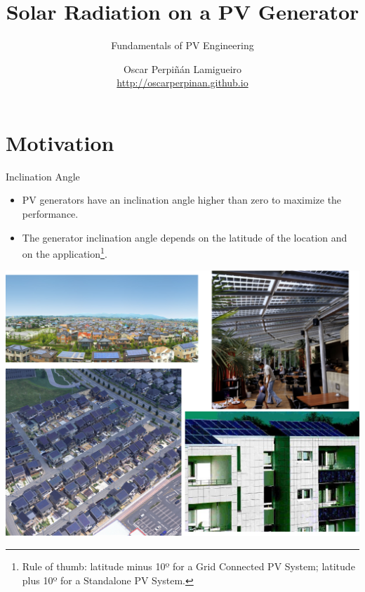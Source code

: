 \documentclass[xcolor={usenames,svgnames,dvipsnames}]{beamer}
\author{Oscar Perpiñán Lamigueiro \\ \url{http://oscarperpinan.github.io}}
\date{}
\title{Solar Radiation on a PV Generator}
\subtitle{Fundamentals of PV Engineering}
\begin{document}
\maketitle

\section{Motivation}
\label{sec:orgf4af781}
\begin{frame}[label={sec:org9c4a0ec}]{Inclination Angle}
\begin{itemize}
\item PV generators have an \alert{inclination angle higher than zero} to maximize the performance.
\item The generator inclination angle depends on the latitude of the location and on the application\footnote{Rule of thumb: latitude minus 10º for a Grid Connected PV System; latitude plus 10º for a Standalone PV System.}.
\end{itemize}

\begin{center}
\includegraphics[height=0.5\textheight]{../figs/PVUrban.png}
\end{center}
\end{frame}
\end{document}
